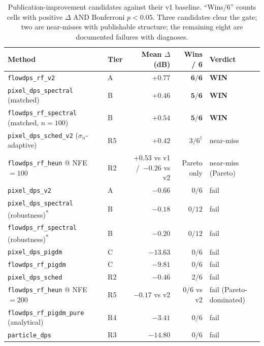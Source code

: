 \documentclass{article}
\begin{document}
\begin{table}[h]
  \centering
  \caption{Publication-improvement candidates against their v1
    baseline. ``Wins/6'' counts cells with positive $\Delta$ AND
    Bonferroni $p<0.05$. Three candidates clear the gate; two are
    near-misses with publishable structure; the remaining eight are
    documented failures with diagnoses.}
  \label{tab:ablations}
  \begin{tabular}{llrrl}
    \toprule
    Method & Tier & Mean $\Delta$ (dB) & Wins / 6 & Verdict \\
    \midrule
    \texttt{flowdps\_rf\_v2}                          & A & $\boldsymbol{+0.77}$ & $\boldsymbol{6/6}$ & \textbf{WIN} \\
    \texttt{pixel\_dps\_spectral} (matched)           & B & $\boldsymbol{+0.46}$ & $\boldsymbol{5/6}$ & \textbf{WIN} \\
    \texttt{flowdps\_rf\_spectral} (matched, $n{=}100$) & B & $\boldsymbol{+0.54}$ & $\boldsymbol{5/6}$ & \textbf{WIN} \\
    \midrule
    \texttt{pixel\_dps\_sched\_v2} ($\sigma_n$-adaptive) & R5 & $+0.42$ & $3/6^\dagger$ & near-miss \\
    \texttt{flowdps\_rf\_heun} @ NFE${=}100$           & R2 & $+0.53$ vs v1 \,/\, $-0.26$ vs v2 & Pareto only & near-miss (Pareto) \\
    \midrule
    \texttt{pixel\_dps\_v2}                           & A & $-0.66$  & $0/6$ & fail \\
    \texttt{pixel\_dps\_spectral} (robustness)\textsuperscript{*}  & B & $-0.18$  & $0/12$ & fail \\
    \texttt{flowdps\_rf\_spectral} (robustness)\textsuperscript{*} & B & $-0.20$  & $0/12$ & fail \\
    \texttt{pixel\_dps\_pigdm}                        & C & $-13.63$ & $0/6$ & fail \\
    \texttt{flowdps\_rf\_pigdm}                       & C & $-9.81$  & $0/6$ & fail \\
    \texttt{pixel\_dps\_sched}                        & R2 & $-0.46$  & $2/6$ & fail \\
    \texttt{flowdps\_rf\_heun} @ NFE${=}200$          & R5 & $-0.17$ vs v2 & $0/6$ vs v2 & fail (Pareto-dominated) \\
    \texttt{flowdps\_rf\_pigdm\_pure} (analytical)    & R4 & $-3.41$  & $0/6$ & fail \\
    \texttt{particle\_dps}                            & R3 & $-14.80$ & $0/6$ & fail \\

\end{tabular}
\end{table}
\end{document}
